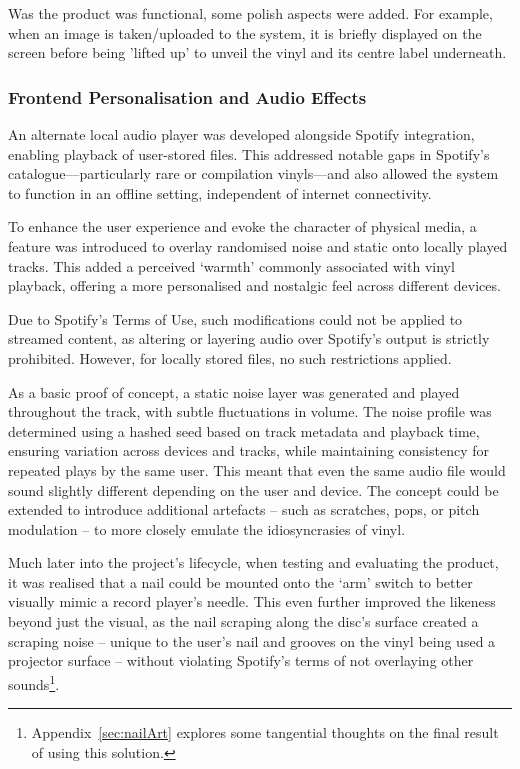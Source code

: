             Was the product was functional, some polish aspects were added. For example, when an image is taken/uploaded to the system, it is briefly displayed on the screen before being 'lifted up' to unveil the vinyl and its centre label underneath.
    
            \subsubsection{Frontend Personalisation and Audio Effects}
    
            An alternate local audio player was developed alongside Spotify integration, enabling playback of user-stored files. This addressed notable gaps in Spotify’s catalogue—particularly rare or compilation vinyls—and also allowed the system to function in an offline setting, independent of internet connectivity.
    
            To enhance the user experience and evoke the character of physical media, a feature was introduced to overlay randomised noise and static onto locally played tracks. This added a perceived ‘warmth’ commonly associated with vinyl playback, offering a more personalised and nostalgic feel across different devices.
            
            Due to Spotify’s Terms of Use, such modifications could not be applied to streamed content, as altering or layering audio over Spotify’s output is strictly prohibited. However, for locally stored files, no such restrictions applied.
            
            As a basic proof of concept, a static noise layer was generated and played throughout the track, with subtle fluctuations in volume. The noise profile was determined using a hashed seed based on track metadata and playback time, ensuring variation across devices and tracks, while maintaining consistency for repeated plays by the same user. This meant that even the same audio file would sound slightly different depending on the user and device. The concept could be extended to introduce additional artefacts -- such as scratches, pops, or pitch modulation -- to more closely emulate the idiosyncrasies of vinyl.
    
            Much later into the project's lifecycle, when testing and evaluating the product, it was realised that a nail could be mounted onto the `arm' switch to better visually mimic a record player's needle. This even further improved the likeness beyond just the visual, as the nail scraping along the disc's surface created a scraping noise -- unique to the user's nail and grooves on the vinyl being used a projector surface -- without violating Spotify's terms of not overlaying other sounds\footnote{Appendix~\ref{sec:nailArt} explores some tangential thoughts on the final result of using this solution.}.
        
